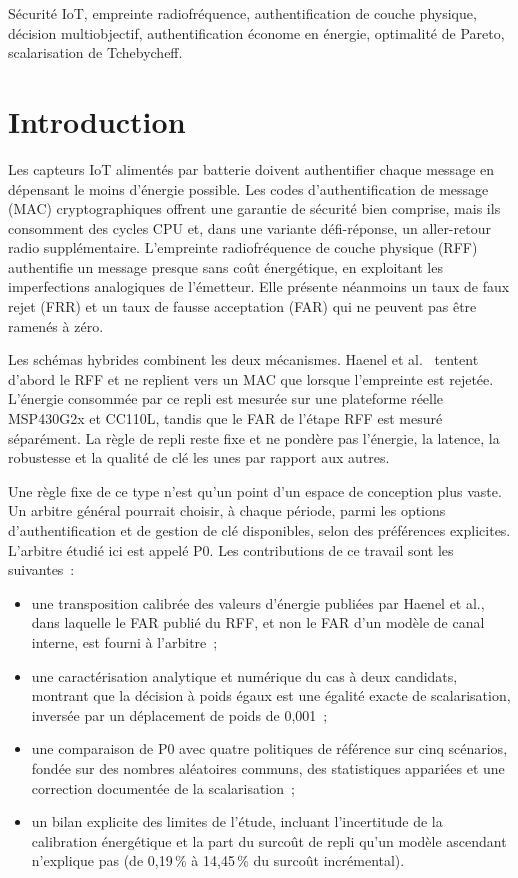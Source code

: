 \documentclass[conference]{IEEEtran}
\begin{document}
\begin{IEEEkeywords}
Sécurité IoT, empreinte radiofréquence, authentification de couche physique, décision multiobjectif, authentification économe en énergie, optimalité de Pareto, scalarisation de Tchebycheff.
\end{IEEEkeywords}

\section{Introduction}

Les capteurs IoT alimentés par batterie doivent authentifier chaque message en dépensant le moins d'énergie possible. Les codes d'authentification de message (MAC) cryptographiques offrent une garantie de sécurité bien comprise, mais ils consomment des cycles CPU et, dans une variante défi-réponse, un aller-retour radio supplémentaire. L'empreinte radiofréquence de couche physique (RFF) authentifie un message presque sans coût énergétique, en exploitant les imperfections analogiques de l'émetteur. Elle présente néanmoins un taux de faux rejet (FRR) et un taux de fausse acceptation (FAR) qui ne peuvent pas être ramenés à zéro.

Les schémas hybrides combinent les deux mécanismes. Haenel et al.~\cite{haenel2021practical} tentent d'abord le RFF et ne replient vers un MAC que lorsque l'empreinte est rejetée. L'énergie consommée par ce repli est mesurée sur une plateforme réelle MSP430G2x et CC110L, tandis que le FAR de l'étape RFF est mesuré séparément. La règle de repli reste fixe et ne pondère pas l'énergie, la latence, la robustesse et la qualité de clé les unes par rapport aux autres.

Une règle fixe de ce type n'est qu'un point d'un espace de conception plus vaste. Un arbitre général pourrait choisir, à chaque période, parmi les options d'authentification et de gestion de clé disponibles, selon des préférences explicites. L'arbitre étudié ici est appelé P0. Les contributions de ce travail sont les suivantes~:
\begin{itemize}
  \item une transposition calibrée des valeurs d'énergie publiées par Haenel et al., dans laquelle le FAR publié du RFF, et non le FAR d'un modèle de canal interne, est fourni à l'arbitre~;
  \item une caractérisation analytique et numérique du cas à deux candidats, montrant que la décision à poids égaux est une égalité exacte de scalarisation, inversée par un déplacement de poids de 0,001~;
  \item une comparaison de P0 avec quatre politiques de référence sur cinq scénarios, fondée sur des nombres aléatoires communs, des statistiques appariées et une correction documentée de la scalarisation~;
  \item un bilan explicite des limites de l'étude, incluant l'incertitude de la calibration énergétique et la part du surcoût de repli qu'un modèle ascendant n'explique pas (de 0,19\,\% à 14,45\,\% du surcoût incrémental).
\end{itemize}
\end{document}
